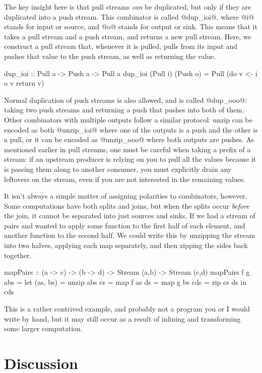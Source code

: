 The key insight here is that pull streams \emph{can} be duplicated, but only if they are duplicated into a push stream.
This combinator is called @dup_ioi@, where @i@ stands for input or source, and @o@ stands for output or sink.
This means that it takes a pull stream and a push stream, and returns a new pull stream.
Here, we construct a pull stream that, whenever it is pulled, pulls from its input and pushes that value to the push stream, as well as returning the value.

\begin{code}
dup_ioi :: Pull a -> Push a -> Pull a
dup_ioi (Pull i) (Push o) = Pull (do
  v <- i
  o v
  return v)
\end{code}

Normal duplication of push streams is also allowed, and is called @dup_ooo@: taking two push streams and returning a push that pushes into both of them.
Other combinators with multiple outputs follow a similar protocol: unzip can be encoded as both @unzip_ioi@ where one of the outputs is a push and the other is a pull, or it can be encoded as @unzip_ooo@ where both outputs are pushes.
As mentioned earlier in pull streams, one must be careful when taking a prefix of a stream: if an upstream producer is relying on you to pull all the values because it is passing them along to another consumer, you must explicitly drain any leftovers on the stream, even if you are not interested in the remaining values.

It isn't always a simple matter of assigning polarities to combinators, however.
Some computations have both splits and joins, but when the splits occur \emph{before} the join, it cannot be separated into just sources and sinks.
If we had a stream of pairs and wanted to apply some function to the first half of each element, and another function to the second half.
We could write this by unzipping the stream into two halves, applying each map separately, and then zipping the sides back together.
\begin{code}
mapPairs :: (a -> c) -> (b -> d) -> Stream (a,b) -> Stream (c,d)
mapPairs f g abs
 = let (as, bs) = unzip abs
       cs       = map f as
       ds       = map g bs
       cds      = zip cs ds
   in  cds
\end{code}

This is a rather contrived example, and probably not a program you or I would write by hand, but it may still occur as a result of inlining and transforming some larger computation.

\section{Discussion}

